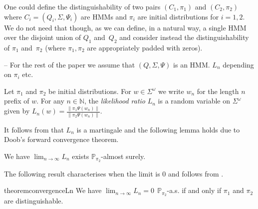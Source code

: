 \documentclass[a4paper,UKenglish,cleveref, autoref,mathscr]{lipics-v2019}
\newcommand{\NN}{\mathbb{N}}
\newcommand{\PP}{\mathbb{P}}
\newcommand{\1}{\mathbbm{1}}
\begin{document}
One could define the distinguishability of two pairs $(C_1,\pi_1)$ and $(C_2,\pi_2)$ where $C_i = (Q_i, \Sigma, \Psi_i)$ are HMMs and $\pi_i$ are initial distributions for $i=1,2$.
We do not need that though, as we can define, in a natural way, a single HMM over the disjoint union of $Q_1$ and~$Q_2$ and consider instead the distinguishability of $\pi_1$ and~$\pi_2$ (where $\pi_1,\pi_2$ are appropriately padded with zeros).

-- For the rest of the paper we assume that $(Q, \Sigma, \Psi)$ is an HMM. $L_n$ depending on $\pi_i$ etc.

\begin{definition}
Let $\pi_1$ and $\pi_2$ be initial distributions. For $w \in \Sigma^\omega$ we write $w_n$ for the length $n$ prefix of $w$. For any $n \in \NN$, the \emph{likelihood ratio} $L_n$ is a random variable on $\Sigma^\omega$ given by $L_n(w) = \frac{\| \pi_1 \Psi(w_n) \|}{\| \pi_2 \Psi(w_n) \|}$.
\end{definition}
It follows from \cite[Proposition 6]{kief14} that $L_n$ is a martingale and the following lemma holds due to Doob's forward convergence theorem.
\begin{lemma}
We have $\lim_{n \rightarrow \infty} L_n$ exists $\PP_{\pi_2}$-almost surely. 
\end{lemma}
The following result characterises when the limit is $0$ and follows from \cite{kief14}.
\begin{restatable}{theorem}{convergenceLn}\label{convergenceLn}
We have $\lim_{n \rightarrow \infty} L_n = 0 \ \ \PP_{\pi_2}$-a.s. if and only if $\pi_1$ and $\pi_2$ are distinguishable.
\end{restatable}
\end{document}
